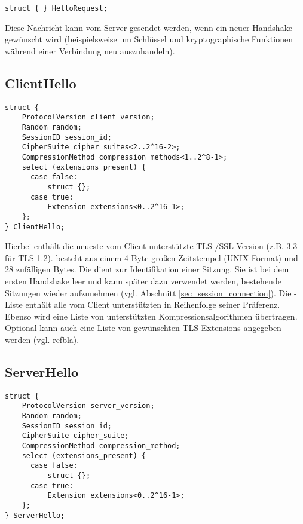 \begin{lstlisting}
struct { } HelloRequest;
\end{lstlisting}

Diese Nachricht kann vom Server gesendet werden, wenn ein neuer Handshake gewünscht wird (beispielsweise um Schlüssel und kryptographische Funktionen während einer Verbindung neu auszuhandeln).

\subsection*{ClientHello}

\begin{lstlisting}
struct {
	ProtocolVersion client_version;
	Random random;
	SessionID session_id;
	CipherSuite cipher_suites<2..2^16-2>;
	CompressionMethod compression_methods<1..2^8-1>;
	select (extensions_present) {
	  case false:
	      struct {};
	  case true:
	      Extension extensions<0..2^16-1>;
	};
} ClientHello;
\end{lstlisting}

Hierbei enthält  die neueste vom Client unterstützte TLS-/SSL-Version (z.B. 3.3 für TLS 1.2). 
 besteht aus einem 4-Byte großen Zeitstempel (UNIX-Format) und 28 zufälligen Bytes. 
Die  dient zur Identifikation einer Sitzung. Sie ist bei dem ersten Handshake leer und kann später dazu verwendet werden, bestehende Sitzungen wieder aufzunehmen (vgl. Abschnitt \ref{sec_session_connection}). 
Die \ciphersuite{}-Liste enthält alle vom Client unterstützten \ciphersuites{} in Reihenfolge seiner Präferenz. 
Ebenso wird eine Liste von unterstützten Kompressionsalgorithmen übertragen. 
Optional kann auch eine Liste von gewünschten TLS-Extensions angegeben werden (vgl. refbla).

\subsection*{ServerHello}

\begin{lstlisting}
struct {
	ProtocolVersion server_version;
	Random random;
	SessionID session_id;
	CipherSuite cipher_suite;
	CompressionMethod compression_method;
	select (extensions_present) {
	  case false:
	      struct {};
	  case true:
	      Extension extensions<0..2^16-1>;
	};
} ServerHello;
\end{lstlisting}

